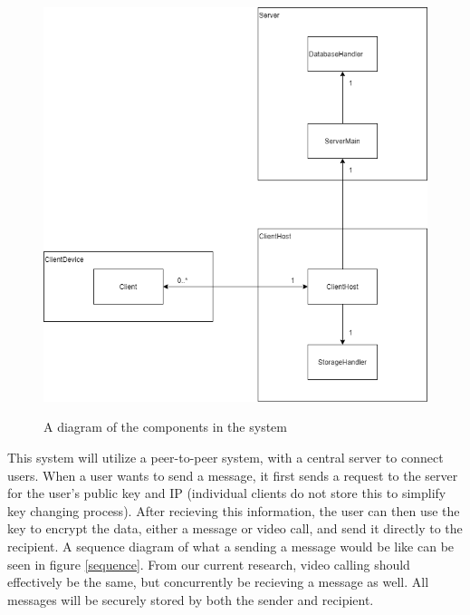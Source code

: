 \documentclass[titlepage]{article}
\begin{document}
      \begin{center}
          \begin{figure}[!ht]
              \includegraphics[scale=.5]{graphics/arch.png}
              \label{componenets}
              \caption{A diagram of the components in the system}
          \end{figure}
      \end{center}

      This system will utilize a peer-to-peer system, with a central server to connect users.
      When a user wants to send a message, it first sends a request to the server for the user's public key and IP (individual clients do not store this to simplify key changing process).
      After recieving this information, the user can then use the key to encrypt the data, either a message or video call, and send it directly to the recipient.
      A sequence diagram of what a sending a message would be like can be seen in figure \ref{sequence}.
      From our current research, video calling should effectively be the same, but concurrently be recieving a message as well.
      All messages will be securely stored by both the sender and recipient.
\end{document}
